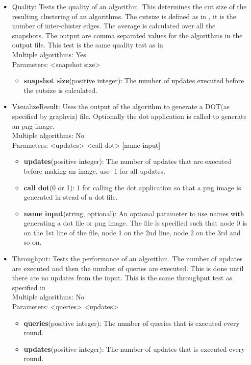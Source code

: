 \documentclass[a4paper]{article}
\begin{document}
\begin{itemize}
	\item Quality: Tests the quality of an algorithm. This determines the cut size of the resulting clustering of an algorithms. The cutsize is defined as in \cite{paper}, it is the number of inter-cluster edges. The average is calculated over all the snapshots. The output are comma separated values for the algorithms in the output file. This test is the same quality test as in \cite{paper} \\
	Multiple algorithms: Yes \\
	Parameters: <snapshot size>
	
	\begin{itemize}
		\item \textbf{snapshot size}(positive integer): The number of updates executed before the cutsize is calculated.
	\end{itemize}
	
	\item VisualizeResult: Uses the output of the algorithm to generate a DOT(as specified by graphviz) file. Optionally the dot application is called to generate an png image. \\
	Multiple algorithms: No \\
	Parameters: <updates> <call dot> [name input]
	
	\begin{itemize}
		\item \textbf{updates}(positive integer): The number of updates that are executed before making an image, use -1 for all updates.
		\item \textbf{call dot}(0 or 1): 1 for calling the dot application so that a png image is generated in stead of a dot file.
		\item \textbf{name input}(string, optional): An optional parameter to use names with generating a dot file or png image. The file is specified such that node 0 is on the 1st line of the file, node 1 on the 2nd line, node 2 on the 3rd and so on.
	\end{itemize}
	
	\item Throughput: Tests the performance of an algorithm. The number of updates are executed and then the number of queries are executed. This is done until there are no updates from the input. This is the same throughput test as specified in \cite{paper} \\
	Multiple algorithms: No \\
	Parameters: <queries> <updates>
	
	\begin{itemize}
		\item \textbf{queries}(positive integer): The number of queries that is executed every round.
		\item \textbf{updates}(positive integer): The number of updates that is executed every round.
	\end{itemize}
\end{itemize}
\end{document}
